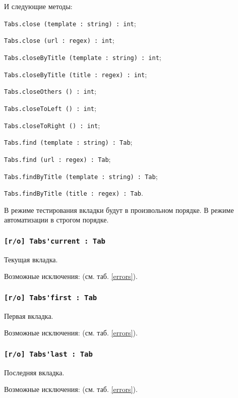 И следующие методы:
\begin{icItems}
	\item \lstinline|Tabs.close (template : string) : int|;
	\item \lstinline|Tabs.close (url : regex) : int|;
	\item \lstinline|Tabs.closeByTitle (template : string) : int|;
	\item \lstinline|Tabs.closeByTitle (title : regex) : int|;
	\item \lstinline|Tabs.closeOthers () : int|;
	\item \lstinline|Tabs.closeToLeft () : int|;
	\item \lstinline|Tabs.closeToRight () : int|;
	\item \lstinline|Tabs.find (template : string) : Tab|;
	\item \lstinline|Tabs.find (url : regex) : Tab|;
	\item \lstinline|Tabs.findByTitle (template : string) : Tab|;
	\item \lstinline|Tabs.findByTitle (title : regex) : Tab|.
\end{icItems}

В режиме тестирования вкладки будут в произвольном порядке. В режиме автоматизации в строгом порядке.

\subsubsection{\lstinline|[r/o] Tabs'current : Tab|}

Текущая вкладка.

Возможные исключения:  (см. таб. \ref{errors}).

\subsubsection{\lstinline|[r/o] Tabs'first : Tab|}

Первая вкладка.

Возможные исключения:  (см. таб. \ref{errors}).

\subsubsection{\lstinline|[r/o] Tabs'last : Tab|}

Последняя вкладка.

Возможные исключения:  (см. таб. \ref{errors}).

